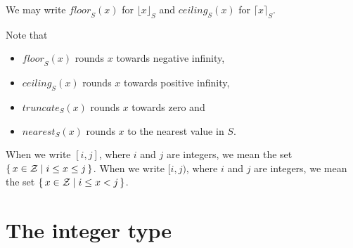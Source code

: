 We may write $\mathit{floor}_S(x)$ for $\lfloor x\rfloor_S$ and
$\mathit{ceiling}_S(x)$ for $\lceil x\rceil_S$.

Note that
\begin{itemize}
\item $\mathit{floor}_S(x)$ rounds $x$ towards negative infinity,
\item $\mathit{ceiling}_S(x)$ rounds $x$ towards positive infinity,
\item $\mathit{truncate}_S(x)$ rounds $x$ towards zero and
\item $\mathit{nearest}_S(x)$ rounds $x$ to the nearest value in $S$.
\end{itemize}
When we write $[i,j]$,
where $i$ and $j$ are integers, we mean the
set $\{\,x\in\mathcal{Z} \mid i\leq x\leq j\,\}$.
When we write $[i,j)$\index{ interval open@$[\cdot,\cdot)$},
where $i$ and $j$ are integers, we mean the
set $\{\,x\in\mathcal{Z} \mid i\leq x< j\,\}$.

\section{The integer type}

\label{section:integer-type}

